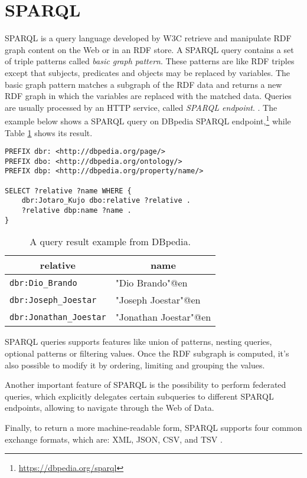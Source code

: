 \section{SPARQL}
\label{sec:sparql}

\ac{SPARQL} is a query language developed by \ac{W3C} retrieve and manipulate \ac{RDF} graph content on the Web or in an \ac{RDF} store. A \ac{SPARQL} query contains a set of triple patterns called \textit{basic graph pattern}. These patterns are like \ac{RDF} triples except that subjects, predicates and objects may be replaced by variables. The basic graph pattern matches a subgraph of the \ac{RDF} data and returns a new \ac{RDF} graph in which the variables are replaced with the matched data. Queries are usually processed by an \ac{HTTP} service, called \textit{\ac{SPARQL} endpoint}. \cite{world2013sparql}. The example below shows a \ac{SPARQL} query on DBpedia \ac{SPARQL} endpoint,\footnote{\url{https://dbpedia.org/sparql}} while Table \ref{tab:sparql-example} shows its result.

\begin{verbatim}
PREFIX dbr: <http://dbpedia.org/page/>
PREFIX dbo: <http://dbpedia.org/ontology/>
PREFIX dbp: <http://dbpedia.org/property/name/>

SELECT ?relative ?name WHERE {
    dbr:Jotaro_Kujo dbo:relative ?relative .
    ?relative dbp:name ?name .
}
\end{verbatim}

\begin{table}[!ht]
    \centering
    \onehalfspacing
    \begin{tabular}{|l|l|}
        \hline
        \multicolumn{1}{|c|}{\textbf{relative}} & \multicolumn{1}{c|}{\textbf{name}} \\ \hline
        \verb#dbr:Dio_Brando# & "Dio Brando"@en \\ \hline
        \verb#dbr:Joseph_Joestar# & "Joseph Joestar"@en \\ \hline
        \verb#dbr:Jonathan_Joestar# & "Jonathan Joestar"@en \\ \hline
    \end{tabular}
    \caption{A query result example from DBpedia.}
    \label{tab:sparql-example}
\end{table}

\ac{SPARQL} queries supports features like union of patterns, nesting queries, optional patterns or filtering values. Once the \ac{RDF} subgraph is computed, it's also possible to modify it by ordering, limiting and grouping the values.

Another important feature of \ac{SPARQL} is the possibility to perform federated queries, which explicitly delegates certain subqueries to different \ac{SPARQL} endpoints, allowing to navigate through the Web of Data.

Finally, to return a more machine-readable form, \ac{SPARQL} supports four common exchange formats, which are: \ac{XML}, \ac{JSON}, \ac{CSV}, and \ac{TSV} \cite{world2013sparql}.